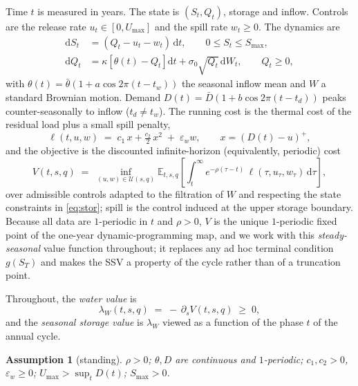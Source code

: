 \documentclass[pdflatex,sn-mathphys-num]{sn-jnl}
\theoremstyle{thmstyleone}
\newtheorem{assumption}{Assumption}
\theoremstyle{thmstyletwo}
\theoremstyle{thmstylethree}
\newcommand{\dif}{\mathrm{d}}
\newcommand{\E}{\mathbb{E}}
\newcommand{\ssv}{\lambda_{W}}
\begin{document}
Time $t$ is measured in years. The state is $(S_t,Q_t)$, storage and
inflow. Controls are the release rate $u_t \in [0,U_{\max}]$ and the spill
rate $w_t \ge 0$. The dynamics are
\begin{align}
\dif S_t &= (Q_t - u_t - w_t)\,\dif t, \qquad 0 \le S_t \le S_{\max},
\label{eq:stor}\\
\dif Q_t &= \kappa\left[\theta(t) - Q_t\right]\dif t
 + \sigma_0 \sqrt{Q_t}\,\dif W_t, \qquad Q_t \ge 0,
\label{eq:cir}
\end{align}
with $\theta(t) = \bar\theta\left(1 + a\cos 2\pi(t - t_w)\right)$ the
seasonal inflow mean and $W$ a standard Brownian motion. Demand
$D(t) = \bar D\left(1 + b\cos 2\pi(t - t_d)\right)$ peaks
counter-seasonally to inflow ($t_d \ne t_w$). The running cost is the
thermal cost of the residual load plus a small spill penalty,
\begin{equation}
\ell(t,u,w) \;=\; c_1\,x + \tfrac{c_2}{2}\,x^2 \;+\; \varepsilon_w w,
\qquad x = \left(D(t)-u\right)^+,
\label{eq:cost}
\end{equation}
and the objective is the discounted infinite-horizon (equivalently,
periodic) cost
\begin{equation}
V(t,s,q) \;=\; \inf_{(u,w)\in\mathcal U(s,q)}
\E_{t,s,q}\!\left[\int_t^{\infty} e^{-\rho(\tau-t)}\,
\ell(\tau,u_\tau,w_\tau)\,\dif\tau\right],
\label{eq:objective}
\end{equation}
over admissible controls adapted to the filtration of $W$ and respecting
the state constraints in \eqref{eq:stor}; spill is the control induced at
the upper storage boundary. Because all data are $1$-periodic in $t$ and
$\rho>0$, $V$ is the unique $1$-periodic fixed point of the one-year
dynamic-programming map, and we work with this \emph{steady-seasonal}
value function throughout; it replaces any ad hoc terminal condition
$g(S_T)$ and makes the SSV a property of the cycle rather than of a
truncation point.

Throughout, the \emph{water value} is
\begin{equation}
\ssv(t,s,q) \;=\; -\,\partial_s V(t,s,q) \;\ge\; 0,
\end{equation}
and the \emph{seasonal storage value} is $\ssv$ viewed as a function of
the phase $t$ of the annual cycle.

\begin{assumption}[standing]\label{ass:standing}
$\rho>0$; $\theta,D$ are continuous and $1$-periodic; $c_1,c_2>0$,
$\varepsilon_w\ge 0$; $U_{\max} > \sup_t D(t)$; $S_{\max}>0$.
\end{assumption}
\end{document}
